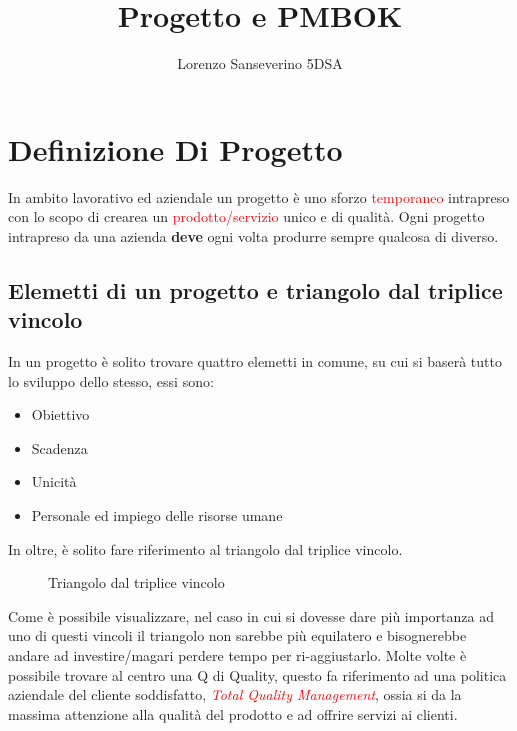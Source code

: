 \documentclass{report}
\title{Progetto e PMBOK}
\author{Lorenzo Sanseverino 5DSA}
\begin{document}
\tableofcontents
\maketitle


\section{Definizione Di Progetto}

In ambito lavorativo ed aziendale un progetto è uno sforzo \textcolor{red}{temporaneo} intrapreso con lo scopo di crearea un \textcolor{red}{prodotto/servizio} unico e di qualità.
Ogni progetto intrapreso da una azienda \textbf{deve} ogni volta produrre sempre qualcosa di diverso. 

\subsection{Elemetti di un progetto e triangolo dal triplice vincolo}
In un progetto è solito trovare quattro elemetti in comune, su cui si baserà tutto lo sviluppo dello stesso, essi sono:

\begin{itemize}
\item Obiettivo
\item Scadenza
\item Unicità
\item Personale ed impiego delle risorse umane
\end{itemize}

In oltre, è solito fare riferimento al triangolo dal triplice vincolo.
\begin{figure}[h]
\caption{Triangolo dal triplice vincolo}
\label{t}
\end{figure}
Come è possibile visualizzare, nel caso in cui si dovesse dare più importanza ad uno di questi vincoli il triangolo non sarebbe più equilatero e bisognerebbe andare ad investire/magari perdere tempo per ri-aggiustarlo.
Molte volte è possibile trovare al centro una Q di Quality, questo fa riferimento ad una politica aziendale del cliente soddisfatto, \textit{\textcolor{red}{Total Quality Management}}, ossia si da la massima attenzione alla qualità del prodotto e ad offrire servizi ai clienti.
\end{document}
